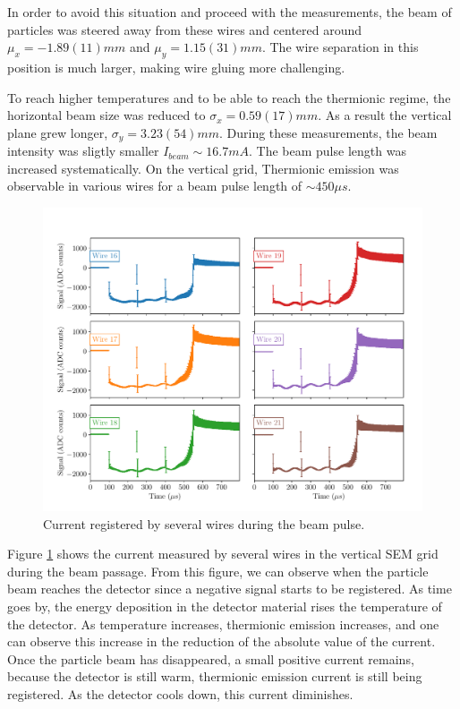 In order to avoid this situation and proceed with the measurements, the beam of particles was steered away from these wires and centered around $\mu_x = -1.89(11) mm$ and $\mu_y = 1.15(31) mm$. The wire separation in this position is much larger, making wire gluing more challenging. 

To reach higher temperatures and to be able to reach the thermionic regime, the horizontal beam size was reduced to $\sigma_x = 0.59(17) mm$. As a result the vertical plane grew longer, $\sigma_y = 3.23(54) mm$. During these measurements, the beam intensity was sligtly smaller $I_{beam} \sim 16.7 mA$. The beam pulse length was increased systematically. On the vertical grid, Thermionic emission was observable in various wires for a beam pulse length of $\sim 450 \mu s$. 

\begin{figure}[h]
    \centering
    \includegraphics[width=0.9\columnwidth]{Figure_ThermionicMeasurements/VerticalThermoCurrent.pdf}
    \caption{Current registered by several wires during the beam pulse.}
    \label{fig:MeasuredThermo}
\end{figure}

Figure \ref{fig:MeasuredThermo} shows the current measured by several wires in the vertical SEM grid during the beam passage. From this figure, we can observe when the particle beam reaches the detector since a negative signal starts to be registered. As time goes by, the energy deposition in the detector material rises the temperature of the detector. As temperature increases, thermionic emission increases, and one can observe this increase in the reduction of the absolute value of the current. Once the particle beam has disappeared, a small positive current remains, because the detector is still warm, thermionic emission current is still being registered.  As the detector cools down, this current diminishes. 

